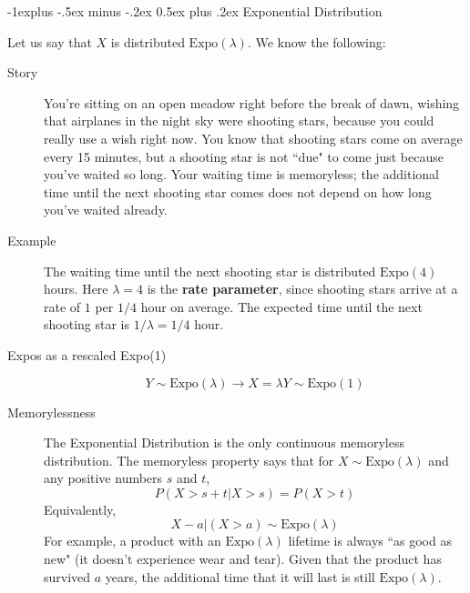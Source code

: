\documentclass[6pt, landscape]{article}
\makeatletter
\renewcommand{\subsection}{\@startsection{subsection}{2}{0mm}%
                                {-1explus -.5ex minus -.2ex}%
                                {0.5ex plus .2ex}%
                                {\small\bfseries}}
\newcommand{\Expo}{\textrm{Expo}}
\makeatother
\begin{document}
\begin{multicols}{3}
        \subsection{Exponential Distribution}

        Let us say that $X$ is distributed $\Expo(\lambda)$. We know the following:
        \begin{description}
                \item[Story] You're sitting on an open meadow right before the break of dawn, wishing that airplanes in the night sky were shooting stars, because you could really use a wish right now. You know that shooting stars come on average every 15 minutes, but a shooting star is  not ``due" to come just because you've waited so long. Your waiting time is memoryless;  the additional time until the next shooting star comes does not depend on how long you've waited already.

                \item[Example] The waiting time until the next shooting star is distributed $\Expo(4)$ hours. Here $\lambda=4$ is the \textbf{rate parameter}, since shooting stars arrive at a rate of $1$ per $1/4$ hour on average. The expected time until the next shooting star is $1/\lambda = 1/4$ hour.

                \item[Expos as a rescaled Expo(1)]
                      \[Y \sim \Expo(\lambda) \rightarrow X = \lambda Y \sim \Expo(1)\]


                \item[Memorylessness] The Exponential Distribution is the only continuous memoryless distribution. The memoryless property says that for $X \sim \Expo(\lambda)$ and any positive numbers $s$ and $t$,
                      \[P(X > s + t | X > s) = P(X > t)\]
                      Equivalently,
                      \[X - a | (X > a) \sim \Expo(\lambda)\]
                      For example, a product with an $\Expo(\lambda)$ lifetime is always ``as good as new" (it doesn't experience wear and tear). Given that the product has survived $a$ years, the additional time that it will last is still $\Expo(\lambda)$.


\end{description}
\end{multicols}
\end{document}
